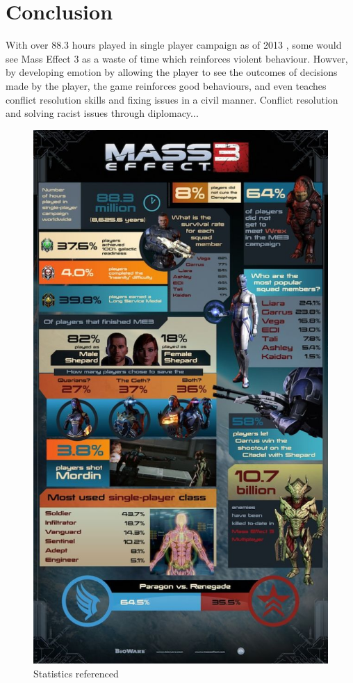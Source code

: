 \documentclass[journal]{IEEEtran}
\begin{document}

\section{Conclusion}
With over 88.3 hours played in single player campaign as of 2013 \cite{ea},
some would see Mass Effect 3 as a waste of time which reinforces violent behaviour. Howver, by developing emotion by allowing the player to see
the outcomes of decisions made by the player, the game reinforces good behaviours, and even teaches conflict resolution skills and fixing issues in a civil manner.
Conflict resolution and solving racist issues through diplomacy...
\nocite{*}



\begin{figure}[]
 \includegraphics[width=.45\textwidth]{stat.jpg}
 \caption{Statistics referenced \cite{ea}}
\end{figure}
\end{document}
